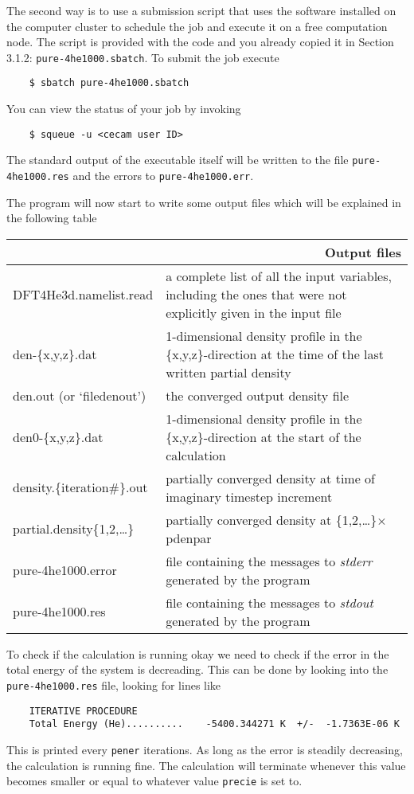 \documentclass[10pt,a4paper]{article}
\begin{document}
	The second way is to use a submission script that uses the software installed on the computer cluster to schedule the job and execute it on a free computation node. The script is provided with the code and you already copied it in Section 3.1.2: \verb|pure-4he1000.sbatch|. To submit the job execute
	\begin{verbatim}
	$ sbatch pure-4he1000.sbatch
	\end{verbatim}
	You can view the status of your job by invoking
	\begin{verbatim}
	$ squeue -u <cecam user ID>
	\end{verbatim}
	The standard output of the executable itself will be written to the file \newline \verb|pure-4he1000.res| and the errors to \verb|pure-4he1000.err|.
	
	The program will now start to write some output files which will be explained in the following table
	\begin{center}
	\begin{tabular}{l|p{7.5cm}}
		\multicolumn{2}{r}{\textbf{Output files}} \\
		\hline\hline
		DFT4He3d.namelist.read			& a complete list of all the input variables, including the ones that were not explicitly given in the input file \\
		\hline
		den-\{x,y,z\}.dat				& 1-dimensional density profile in the \{x,y,z\}-direction at the time of the last written partial density \\
		\hline
		den.out	(or `filedenout')						& the converged output density file \\
		\hline
		den0-\{x,y,z\}.dat				& 1-dimensional density profile in the \{x,y,z\}-direction at the start of the calculation \\
		\hline
		density.\{iteration\#\}.out	& partially converged density at time of imaginary timestep increment \\
		\hline
		partial.density\{1,2,\ldots\}	& partially converged density at \{1,2,\ldots\}$\times$pdenpar \\
		\hline
		pure-4he1000.error				& file containing the messages to \emph{stderr} generated by the program \\
		\hline
		pure-4he1000.res				& file containing the messages to \emph{stdout} generated by the program
	\end{tabular}
	\end{center}

	To check if  the calculation is running okay we need to check if the error in the total energy of the system is decreading. This can be done by looking into the \verb|pure-4he1000.res| file, looking for lines like
	\begin{verbatim}
	ITERATIVE PROCEDURE 
	Total Energy (He)..........    -5400.344271 K  +/-  -1.7363E-06 K
	\end{verbatim}
	This is printed every \verb|pener| iterations. As long as the error is steadily decreasing, the calculation is running fine. The calculation will terminate whenever this value becomes smaller or equal to whatever value \verb|precie| is set to.
	
\end{document}
